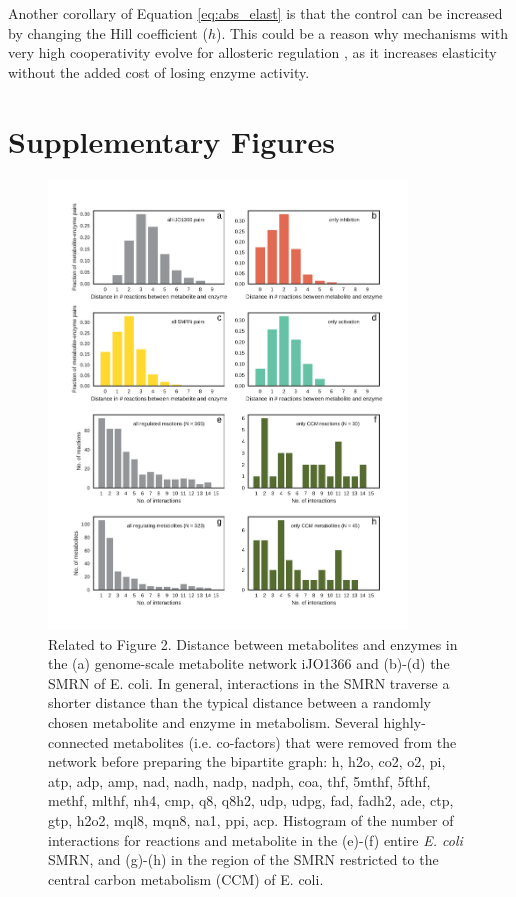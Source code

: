 \documentclass[12pt,a4paper]{article}
\begin{document}
Another corollary of Equation \ref{eq:abs_elast} is that the control can be increased by changing the Hill coefficient ($h$). This could be a reason why mechanisms with very high cooperativity evolve for allosteric regulation \cite{Monod1965-dq}, as it increases elasticity without the added cost of losing enzyme activity.



\clearpage

\section{Supplementary Figures}

\begin{figure}[ht!]
\begin{center}
\includegraphics[width=0.85\textwidth]{../manuscript/figS1.pdf}
\end{center}
\caption{Related to Figure 2. Distance between metabolites and enzymes in the (a) genome-scale metabolite network iJO1366 and (b)-(d) the SMRN of E. coli. In general, interactions in the SMRN traverse a shorter distance than the typical distance between a randomly chosen metabolite and enzyme in metabolism. Several highly-connected metabolites (i.e. co-factors) that were removed from the network before preparing the bipartite graph: h, h2o, co2, o2, pi, atp, adp, amp, nad, nadh, nadp, nadph, coa, thf, 5mthf, 5fthf, methf, mlthf, nh4, cmp, q8, q8h2, udp, udpg, fad, fadh2, ade, ctp, gtp, h2o2, mql8, mqn8, na1, ppi, acp. Histogram of the number of interactions for reactions and metabolite in the (e)-(f) entire \emph{E. coli} SMRN, and (g)-(h) in the region of the SMRN restricted to the central carbon metabolism (CCM) of E. coli. }
\end{figure}
\end{document}
